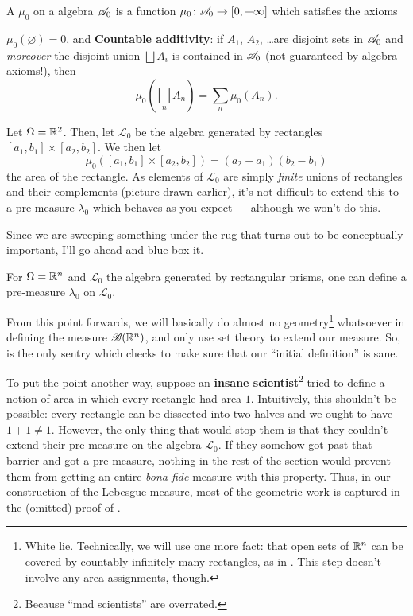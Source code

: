 \begin{definition}
	A  $\mu_0$ on a algebra $\mathscr A_0$
	is a function $\mu_0 \colon \mathscr A_0 \to [0, +\infty]$
	which satisfies the axioms
	\begin{itemize}
		\ii $\mu_0(\varnothing) = 0$, and
		\ii \textbf{Countable additivity}:
		if $A_1$, $A_2$, \dots are disjoint sets in $\mathscr A_0$
		and \emph{moreover} the disjoint union $\bigsqcup A_i$
		is contained in $\mathscr A_0$ (not guaranteed by algebra axioms!),
		then
		\[ \mu_0\left( \bigsqcup_n A_n \right) = \sum_n \mu_0(A_n). \]
	\end{itemize}
\end{definition}

\begin{example}
	Let $\Omega = \mathbb R^2$.
	Then, let $\mathcal{L}_0$ be the algebra generated by rectangles
	$[a_1, b_1] \times [a_2, b_2]$.
	We then let
	\[ \mu_0\left( [a_1, b_1] \times [a_2, b_2] \right)
	= (a_2-a_1)(b_2-b_1) \]
	the area of the rectangle.
	As elements of $\mathcal{L}_0$ are simply \emph{finite} unions
	of rectangles and their complements (picture drawn earlier),
	it's not difficult to extend this to a pre-measure $\lambda_0$
	which behaves as you expect --- although we won't do this.
\end{example}

Since we are sweeping something under the rug that
turns out to be conceptually important,
I'll go ahead and blue-box it.
\begin{proposition}
	\label{prop:lebesgue_rectangle}
	For $\Omega = \mathbb R^n$ and $\mathcal{L}_0$
	the algebra generated by rectangular prisms,
	one can define a pre-measure $\lambda_0$ on $\mathcal{L}_0$.
\end{proposition}
From this point forwards, we will basically do
almost no geometry\footnote{White lie.
	Technically, we will use one more fact:
	that open sets of $\mathbb R^n$ can be covered by countably
	infinitely many rectangles,
	as in .
	This step doesn't involve any area assignments, though.}
whatsoever in defining the measure $\mathscr B(\mathbb R^n)$,
and only use set theory to extend our measure.
So,  is the only sentry
which checks to make sure that our ``initial definition'' is sane.

To put the point another way,
suppose an \textbf{insane scientist}\footnote{Because
	``mad scientists'' are overrated.}
tried to define a notion
of area in which every rectangle had area $1$.
Intuitively, this shouldn't be possible:
every rectangle can be dissected into two halves
and we ought to have $1+1 \ne 1$.
However, the only thing that would stop them is that they couldn't
extend their pre-measure on the algebra $\mathcal{L}_0$.
If they somehow got past that barrier and got a pre-measure,
nothing in the rest of the section would prevent them
from getting an entire \emph{bona fide} measure with this property.
Thus, in our construction of the Lebesgue measure,
most of the geometric work is captured in the (omitted) proof
of .

